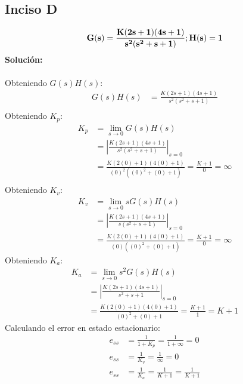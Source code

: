 \documentclass[11pt, twoside]{article}
\begin{document}
\subsection{Inciso D}
\begin{equation*}
    \mathbf{G(s)=\frac{K(2s+1)(4s+1)}{s^{2}(s^{2}+s+1)};\space H(s)=1}
\end{equation*}
\textbf{Solución:}\\\\
Obteniendo $G(s)H(s)$:
\begin{align*}
    G(s)H(s) & = \frac{K(2s+1)(4s+1)}{s^{2}(s^{2}+s+1)} \\
\end{align*}
Obteniendo $K_{p}$:
\begin{align*}
    K_{p} & = \lim_{s\to 0}{G(s)H(s)}                              \\
          & = \left|\frac{K(2s+1)(4s+1)}{s^{2}(s^{2}+s+1)}\right|_{s=0}      \\
          & = \frac{K(2(0)+1)(4(0)+1)}{(0)^{2}((0)^{2}+(0)+1)} = \frac{K+1}{0} = \boxed{\infty} \\
\end{align*}
Obteniendo $K_{v}$:
\begin{align*}
    K_{v} & = \lim_{s\to 0}{sG(s)H(s)}                \\
          & = \left|\frac{K(2s+1)(4s+1)}{s(s^{2}+s+1)}\right|_{s=0}       \\
          & = \frac{K(2(0)+1)(4(0)+1)}{(0)((0)^{2}+(0)+1)} = \frac{K+1}{0} = \boxed{\infty}
\end{align*}
Obteniendo $K_{a}$:
\begin{align*}
    K_{a} & = \lim_{s\to0}{s^{2}G(s)H(s)}                    \\
          & = \left|\frac{K(2s+1)(4s+1)}{s^{2}+s+1}\right|_{s=0}             \\
          & = \frac{K(2(0)+1)(4(0)+1)}{(0)^{2}+(0)+1} = \frac{K+1}{1} = \boxed{K+1}
\end{align*}
\newpage
Calculando el error en estado estacionario:
\begin{align*}
    e_{ss} & = \frac{1}{1+K_{p}} = \frac{1}{1+\infty} = \boxed{0}              \\
    e_{ss} & = \frac{1}{K_{v}} = \frac{1}{\infty} = \boxed{0} \\
    e_{ss} & = \frac{1}{K_{a}} = \frac{1}{K+1} = \boxed{\frac{1}{K+1}}
\end{align*}
\end{document}
